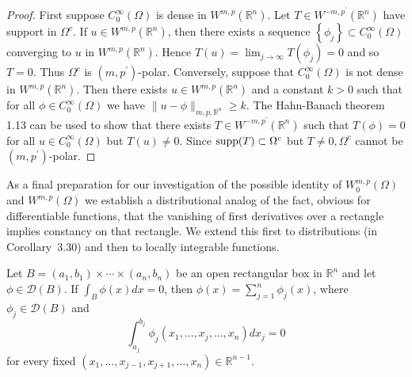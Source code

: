 \begin{proof}
  First suppose $C_0^{\infty}(\Omega)$ is dense in $W^{m,p}\left(\mathbb{R}^n\right)$. Let $T \in W^{-m, p^{\prime}}\left(\mathbb{R}^n\right)$ have support in $\Omega^c$. If $u \in W^{m,p}\left(\mathbb{R}^n\right)$, then there exists a sequence $\left\{\phi_j\right\} \subset C_0^{\infty}(\Omega)$ converging to $u$ in $W^{m,p}\left(\mathbb{R}^n\right)$. Hence $T(u)=\lim _{j \rightarrow \infty} T\left(\phi_j\right)=0$ and so $T=0$. Thus $\Omega^c$ is $\left(m, p^{\prime}\right)$-polar.
  Conversely, suppose that $C_0^{\infty}(\Omega)$ is not dense in $W^{m,p}\left(\mathbb{R}^n\right)$. Then there exists $u \in W^{m,p}\left(\mathbb{R}^n\right)$ and a constant $k>0$ such that for all $\phi \in C_0^{\infty}(\Omega)$ we have $\|u-\phi\|_{m, p, \mathbb{R}^n} \geq k$. The Hahn-Banach theorem 1.13 can be used to show that there exists $T \in W^{-m, p^{\prime}}\left(\mathbb{R}^n\right)$ such that $T(\phi)=0$ for all $u \in C_0^{\infty}(\Omega)$ but $T(u) \neq 0$. Since $\operatorname{supp}(T) \subset \Omega^c$ but $T \neq 0, \Omega^c$ cannot be $\left(m, p^{\prime}\right)$-polar.
\end{proof}

As a final preparation for our investigation of the possible identity of $W_0^{m, p}(\Omega)$ and $W^{m,p}(\Omega)$ we establish a distributional analog of the fact, obvious for differentiable functions, that the vanishing of first derivatives over a rectangle implies constancy on that rectangle. We extend this first to distributions (in Corollary~3.30) and then to locally integrable functions.


\begin{lemma}
  Let $B=\left(a_1, b_1\right) \times \cdots \times\left(a_n, b_n\right)$ be an open rectangular box in $\mathbb{R}^n$ and let $\phi \in \mathscr{D}(B)$. If $\int_B \phi(x) d x=0$, then $\phi(x)=\sum_{j=1}^n \phi_j(x)$, where $\phi_j \in \mathscr{D}(B)$ and
  \begin{equation}\label{eq:3.8}
    \int_{a_j}^{b_j} \phi_j\left(x_1, \ldots, x_j, \ldots, x_n\right) d x_j=0
  \end{equation}
  for every fixed $\left(x_1, \ldots, x_{j-1}, x_{j+1}, \ldots, x_n\right) \in \mathbb{R}^{n-1}$.
\end{lemma}

